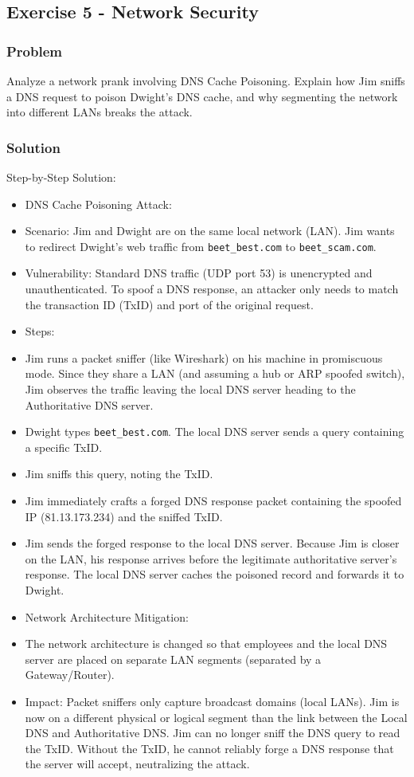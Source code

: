 \documentclass{article}
\begin{document}
\subsection{Exercise 5 - Network Security}
\subsubsection*{Problem}
Analyze a network prank involving DNS Cache Poisoning. Explain how Jim sniffs a DNS request to poison Dwight's DNS cache, and why segmenting the network into different LANs breaks the attack.

\subsubsection*{Solution}
Step-by-Step Solution:

\begin{itemize}
    \item[\textbf{1.}] DNS Cache Poisoning Attack:
    \item Scenario: Jim and Dwight are on the same local network (LAN). Jim wants to redirect Dwight's web traffic from \texttt{beet\_best.com} to \texttt{beet\_scam.com}.
    \item Vulnerability: Standard DNS traffic (UDP port 53) is unencrypted and unauthenticated. To spoof a DNS response, an attacker only needs to match the transaction ID (TxID) and port of the original request.
    \item Steps:
    \item[\textbf{1.}] Jim runs a packet sniffer (like Wireshark) on his machine in promiscuous mode. Since they share a LAN (and assuming a hub or ARP spoofed switch), Jim observes the traffic leaving the local DNS server heading to the Authoritative DNS server.
    \item[\textbf{2.}] Dwight types \texttt{beet\_best.com}. The local DNS server sends a query containing a specific TxID.
    \item[\textbf{3.}] Jim sniffs this query, noting the TxID.
    \item[\textbf{4.}] Jim immediately crafts a forged DNS response packet containing the spoofed IP (81.13.173.234) and the sniffed TxID.
    \item[\textbf{5.}] Jim sends the forged response to the local DNS server. Because Jim is closer on the LAN, his response arrives before the legitimate authoritative server's response. The local DNS server caches the poisoned record and forwards it to Dwight.

    \item[\textbf{2.}] Network Architecture Mitigation:
    \item The network architecture is changed so that employees and the local DNS server are placed on separate LAN segments (separated by a Gateway/Router).
    \item Impact: Packet sniffers only capture broadcast domains (local LANs). Jim is now on a different physical or logical segment than the link between the Local DNS and Authoritative DNS. Jim can no longer sniff the DNS query to read the TxID. Without the TxID, he cannot reliably forge a DNS response that the server will accept, neutralizing the attack.
\end{itemize}
\end{document}
